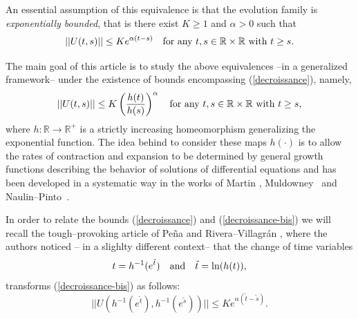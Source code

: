 \documentclass[10pt]{amsart}
\numberwithin{equation}{section}
\begin{document}
An essential assumption of this equivalence is that the evolution family is \textit{exponentially bounded}, that is there exist $K\geq 1$ and $\alpha>0$ such that
\begin{equation}
\label{decroissance}
||U(t,s)||\leq Ke^{\alpha(t-s)} \quad \textnormal{for any $t,s\in \mathbb{R}\times \mathbb{R}$ with $t\geq s$}.
\end{equation}










The main goal of this article is to study the above equivalences --in a generalized framework-- under the existence of bounds encompassing (\ref{decroissance}), namely,
\begin{equation}
\label{decroissance-bis}
||U(t,s)||\leq K\left(\frac{h(t)}{h(s)}\right)^{\alpha}
\quad  \textnormal{for any $t,s\in \mathbb{R}\times \mathbb{R}$ with $t\geq s$},
\end{equation}
where $h\colon \mathbb{R}\to \mathbb{R}^{+}$ is a strictly increasing homeomorphism generalizing the exponential function. The idea behind to consider these maps $h(\cdot)$ is to allow the rates of contraction and expansion to be determined by general growth functions describing the behavior of solutions of differential equations and has been developed in a systematic way in the works of Martin \cite{Martin}, Muldowney~\cite{Muldowney} and Naulin–Pinto~\cite{NaulinPinto}.


In order to relate the bounds (\ref{decroissance}) and (\ref{decroissance-bis}) we will recall
the tough--provoking article of Pe\~na and Rivera--Villagr\'an \cite{JFP}, where the authors noticed -- in a slighlty different context-- that the
change of time variables
\begin{equation}
\label{chv}
t=h^{-1}(e^{\tilde{t}}) \quad \textnormal{and} \quad \tilde{t}=\ln(h(t)),
\end{equation}
transforms (\ref{decroissance-bis}) as follows:
\begin{equation}
\label{decroissance-3}
||U(h^{-1}(e^{\tilde{t}}),h^{-1}(e^{\tilde{s}}))||\leq K e^{\alpha(\tilde{t}-\tilde{s})}.
\end{equation}
\end{document}
